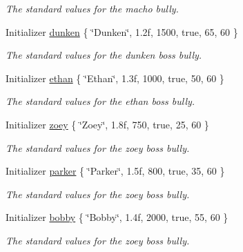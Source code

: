 \begin{DoxyCompactItemize}
\begin{DoxyCompactList}\small\item\em The standard values for the macho bully. \end{DoxyCompactList}\item 
\hypertarget{class_enemy_a0054c724f94ef37d4e82d274d5aa6808}{Initializer \hyperlink{class_enemy_a0054c724f94ef37d4e82d274d5aa6808}{dunken} \{ \char`\"{}Dunken\char`\"{}, 1.\+2f, 1500, true, 65, 60 \}}\label{class_enemy_a0054c724f94ef37d4e82d274d5aa6808}

\begin{DoxyCompactList}\small\item\em The standard values for the dunken boss bully. \end{DoxyCompactList}\item 
\hypertarget{class_enemy_ae1c2e8a37b9d60c81a670c30bf523576}{Initializer \hyperlink{class_enemy_ae1c2e8a37b9d60c81a670c30bf523576}{ethan} \{ \char`\"{}Ethan\char`\"{}, 1.\+3f, 1000, true, 50, 60 \}}\label{class_enemy_ae1c2e8a37b9d60c81a670c30bf523576}

\begin{DoxyCompactList}\small\item\em The standard values for the ethan boss bully. \end{DoxyCompactList}\item 
\hypertarget{class_enemy_a05a3bacef0c241d5bc435d3b2cad0640}{Initializer \hyperlink{class_enemy_a05a3bacef0c241d5bc435d3b2cad0640}{zoey} \{ \char`\"{}Zoey\char`\"{}, 1.\+8f, 750, true, 25, 60 \}}\label{class_enemy_a05a3bacef0c241d5bc435d3b2cad0640}

\begin{DoxyCompactList}\small\item\em The standard values for the zoey boss bully. \end{DoxyCompactList}\item 
\hypertarget{class_enemy_a661e8dd9770b13638cb18572abf84ab3}{Initializer \hyperlink{class_enemy_a661e8dd9770b13638cb18572abf84ab3}{parker} \{ \char`\"{}Parker\char`\"{}, 1.\+5f, 800, true, 35, 60 \}}\label{class_enemy_a661e8dd9770b13638cb18572abf84ab3}

\begin{DoxyCompactList}\small\item\em The standard values for the zoey boss bully. \end{DoxyCompactList}\item 
\hypertarget{class_enemy_a8a6d90afa0b9b58c11dd63487cea981e}{Initializer \hyperlink{class_enemy_a8a6d90afa0b9b58c11dd63487cea981e}{bobby} \{ \char`\"{}Bobby\char`\"{}, 1.\+4f, 2000, true, 55, 60 \}}\label{class_enemy_a8a6d90afa0b9b58c11dd63487cea981e}

\begin{DoxyCompactList}\small\item\em The standard values for the zoey boss bully. \end{DoxyCompactList}\end{DoxyCompactItemize}
